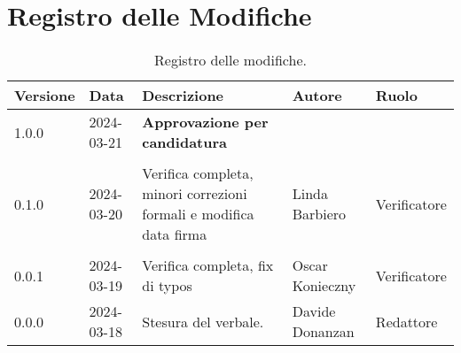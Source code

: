 \section*{Registro delle Modifiche}
\begin{table}[ht!]	
		\centering
		\begin{tabular}{p{1.2cm} p{2cm} p{6cm} p{3cm} p{2cm}}
			\toprule
			\textbf{Versione}& \textbf{Data} & \textbf{Descrizione} & \textbf{Autore} & \textbf{Ruolo} \\
			\midrule
			1.0.0 & 2024-03-21 & \textbf{Approvazione per candidatura} & & \\\\
			0.1.0 & 2024-03-20 & Verifica completa, minori correzioni formali e modifica data firma & Linda Barbiero & Verificatore \\\\
			0.0.1 & 2024-03-19 & Verifica completa, fix di typos & Oscar Konieczny &
			Verificatore \\ %
			0.0.0 & 2024-03-18 & Stesura del verbale.  & Davide Donanzan &
			Redattore \\ %
			\bottomrule
		\end{tabular}
		\caption{Registro delle modifiche.}
		\label{table:Registro delle modifiche.}
\end{table}